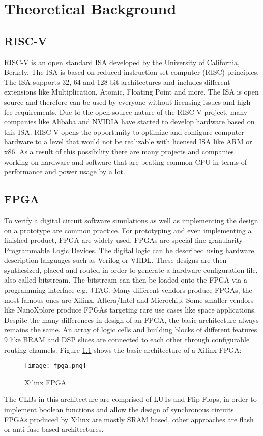 
\chapter{Theoretical Background}
\section{RISC-V}
RISC-V is an open standard \acf{ISA} developed by the
University of California, Berkely. The ISA is based on reduced instruction set
computer (RISC) principles. The ISA supports 32, 64 and 128 bit architectures and
includes different extensions like Multiplication, Atomic, Floating Point and more. The
ISA is open source and therefore can be used by everyone without licensing issues
and high fee requirements. Due to the open source nature of the RISC-V project,
many companies like Alibaba and NVIDIA have started to develop hardware based
on this ISA.
RISC-V opens the opportunity to optimize and configure computer hardware to a
level that would not be realizable with licensed ISA like ARM or x86. As a result of
this possibility there are many projects and companies working on hardware and
software that are beating common CPU in terms of performance and power usage
by a lot.


\section{FPGA}
To verify a digital circuit software simulations as well as implementing the design on
a prototype are common practice. For prototyping and even implementing a finished
product, FPGA are widely used.
FPGAs are special fine granularity Programmable Logic Devices. The digital logic
can be described using hardware description languages such as Verilog or VHDL.
These designs are then synthesized, placed and routed in order to generate a
hardware configuration file, also called bitstream. The bitstream can then be loaded
onto the FPGA via a programming interface e.g. JTAG.
Many different vendors produce FPGAs, the most famous ones are Xilinx,
Altera/Intel and Microchip. Some smaller vendors like NanoXplore produce FPGAs
targeting rare use cases like space applications.
Despite the many differences in design of an FPGA, the basic architecture always
remains the same. An array of logic cells and building blocks of different features
9 like BRAM and DSP slices are connected to each other through configurable routing
channels.
Figure \ref{fig:FPGA} shows the basic architecture of a Xilinx FPGA:\\

\begin{figure}[h]
\centering
\texttt{[image: fpga.png]}
\caption{Xilinx FPGA \cite{xilinx:2017}}
\label{fig:FPGA}
\end{figure}



The CLBs in this architecture are comprised of LUTs and Flip-Flops, in order to implement boolean functions and allow the design of synchronous circuits. FPGAs produced by Xilinx are mostly SRAM based, other approaches are flash or anti-fuse based architectures.